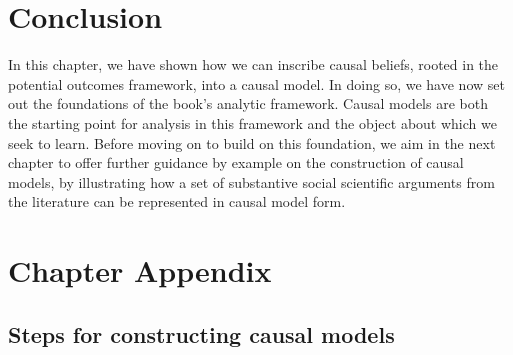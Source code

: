 \documentclass[
  12pt,
]{book}
\begin{document}
\hypertarget{conc2}{%
\section{Conclusion}\label{conc2}}

In this chapter, we have shown how we can inscribe causal beliefs, rooted in the potential outcomes framework, into a causal model. In doing so, we have now set out the foundations of the book's analytic framework. Causal models are both the starting point for analysis in this framework and the object about which we seek to learn. Before moving on to build on this foundation, we aim in the next chapter to offer further guidance by example on the construction of causal models, by illustrating how a set of substantive social scientific arguments from the literature can be represented in causal model form.

\newpage

\hypertarget{chapter-appendix}{%
\section{Chapter Appendix}\label{chapter-appendix}}

\hypertarget{steps-for-constructing-causal-models}{%
\subsection{Steps for constructing causal models}\label{steps-for-constructing-causal-models}}
\end{document}
